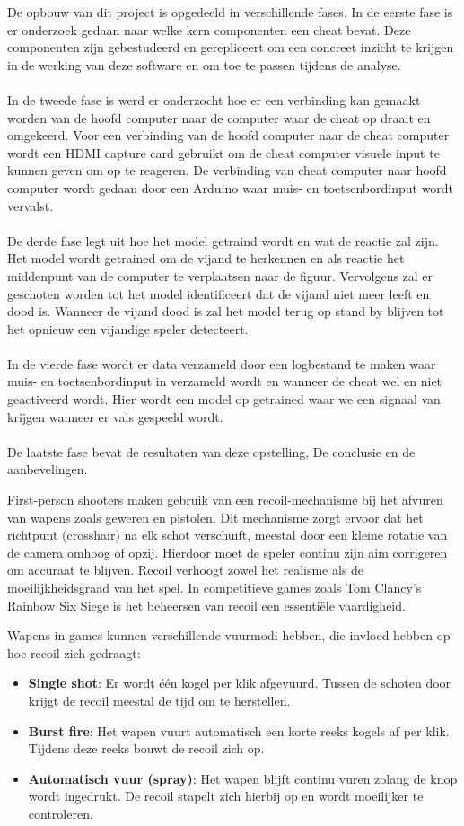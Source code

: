 De opbouw van dit project is opgedeeld in verschillende fases. In de eerste fase is er onderzoek gedaan naar welke kern componenten een cheat bevat.
Deze componenten zijn gebestudeerd en gerepliceert om een concreet inzicht te krijgen in de werking van deze software en om toe te passen tijdens de analyse.
\\\\
In de tweede fase is werd er onderzocht hoe er een verbinding kan gemaakt worden van de hoofd computer naar de computer waar de cheat op draait en omgekeerd.
Voor een verbinding van de hoofd computer naar de cheat computer wordt een HDMI capture card gebruikt om de cheat computer visuele input te kunnen geven om op te reageren.
De verbinding van cheat computer naar hoofd computer wordt gedaan door een Arduino waar muis- en toetsenbordinput wordt vervalst.
\\\\
De derde fase legt uit hoe het model getraind wordt en wat de reactie zal zijn. Het model wordt getrained om de vijand te herkennen en als reactie het middenpunt van de computer te verplaatsen naar de figuur.
Vervolgens zal er geschoten worden tot het model identificeert dat de vijand niet meer leeft en dood is. Wanneer de vijand dood is zal het model terug op stand by blijven tot het opnieuw een vijandige speler detecteert.
\\\\
In de vierde fase wordt er data verzameld door een logbestand te maken waar muis- en toetsenbordinput in verzameld wordt en wanneer de cheat wel en niet geactiveerd wordt.
Hier wordt een model op getrained waar we een signaal van krijgen wanneer er vals gespeeld wordt.
\\\\
De laatste fase bevat de resultaten van deze opstelling, De conclusie en de aanbevelingen.


First-person shooters maken gebruik van een recoil-mechanisme bij het afvuren van wapens zoals geweren en pistolen. Dit mechanisme zorgt ervoor dat het richtpunt (crosshair) na elk schot verschuift, meestal door een kleine rotatie van de camera omhoog of opzij. Hierdoor moet de speler continu zijn aim corrigeren om accuraat te blijven. Recoil verhoogt zowel het realisme als de moeilijkheidsgraad van het spel. In competitieve games zoals Tom Clancy's Rainbow Six Siege is het beheersen van recoil een essentiële vaardigheid.

Wapens in games kunnen verschillende vuurmodi hebben, die invloed hebben op hoe recoil zich gedraagt:
\begin{itemize}
\item \textbf{Single shot}: Er wordt één kogel per klik afgevuurd. Tussen de schoten door krijgt de recoil meestal de tijd om te herstellen.
\item \textbf{Burst fire}: Het wapen vuurt automatisch een korte reeks kogels af per klik. Tijdens deze reeks bouwt de recoil zich op.
\item \textbf{Automatisch vuur (spray)}: Het wapen blijft continu vuren zolang de knop wordt ingedrukt. De recoil stapelt zich hierbij op en wordt moeilijker te controleren.
\end{itemize}

